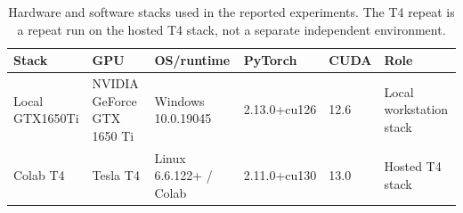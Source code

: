 \begin{table}[!htbp]
\centering\footnotesize
\caption{Hardware and software stacks used in the reported experiments. The T4 repeat is a repeat run on the hosted T4 stack, not a separate independent environment.}
\label{tab:environment-stack-summary}
\setlength{\tabcolsep}{3pt}
\renewcommand{\arraystretch}{1.12}
\begin{tabularx}{\linewidth}{@{}>{\raggedright\arraybackslash}p{1.9cm}>{\raggedright\arraybackslash}X>{\raggedright\arraybackslash}p{2.4cm}ll>{\raggedright\arraybackslash}p{2.4cm}@{}}
\toprule
Stack & GPU & OS/runtime & PyTorch & CUDA & Role \\
\midrule
Local GTX1650Ti & NVIDIA GeForce GTX 1650 Ti & Windows 10.0.19045 & 2.13.0+cu126 & 12.6 & Local workstation stack \\
Colab T4 & Tesla T4 & Linux 6.6.122+ / Colab & 2.11.0+cu130 & 13.0 & Hosted T4 stack \\
\bottomrule
\end{tabularx}
\end{table}
